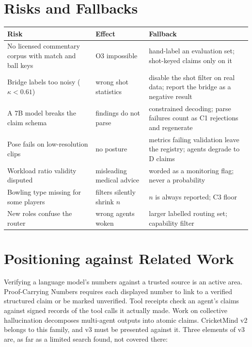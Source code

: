 \documentclass[11pt,a4paper]{article}
\begin{document}
\section{Risks and Fallbacks}

\begin{center}
\footnotesize
\renewcommand{\arraystretch}{1.2}
\begin{tabular}{@{}>{\raggedright\arraybackslash}p{4.6cm}
                  >{\raggedright\arraybackslash}p{4.0cm}
                  >{\raggedright\arraybackslash}p{6.0cm}@{}}
\toprule
\textbf{Risk} & \textbf{Effect} & \textbf{Fallback} \\
\midrule
No licensed commentary corpus with match and ball keys & O3 impossible & hand-label an evaluation set; shot-keyed claims only on it \\
Bridge labels too noisy ($\kappa < 0.61$) & wrong shot statistics & disable the shot filter on real data; report the bridge as a negative result \\
A 7B model breaks the claim schema & findings do not parse & constrained decoding; parse failures count as C1 rejections and regenerate \\
Pose fails on low-resolution clips & no posture & metrics failing validation leave the registry; agents degrade to D claims \\
Workload ratio validity disputed & misleading medical advice & worded as a monitoring flag; never a probability \\
Bowling type missing for some players & filters silently shrink $n$ & $n$ is always reported; C3 floor \\
New roles confuse the router & wrong agents woken & larger labelled routing set; capability filter \\
\bottomrule
\end{tabular}
\label{tab:risks}
\end{center}

\section{Positioning against Related Work}

Verifying a language model's numbers against a trusted source is an active
area. Proof-Carrying Numbers \cite{pcn} requires each displayed number to link
to a verified structured claim or be marked unverified. Tool receipts
\cite{receipts} check an agent's claims against signed records of the tool calls
it actually made. Work on collective hallucination \cite{collective} decomposes
multi-agent outputs into atomic claims. CricketMind v2 belongs to this family,
and v3 must be presented against it. Three elements of v3 are, as far as a
limited search found, not covered there:
\end{document}
